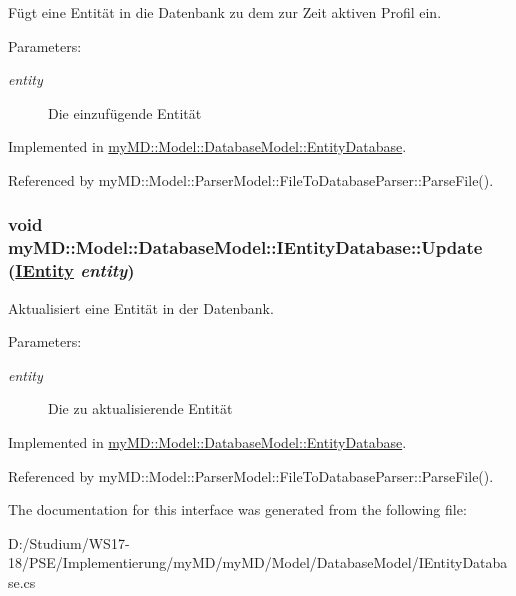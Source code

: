 F\"{u}gt eine Entit\"{a}t in die Datenbank zu dem zur Zeit aktiven Profil ein. 

\begin{Desc}
\item[Parameters:]
\begin{description}
\item[{\em entity}]Die einzuf\"{u}gende Entit\"{a}t\end{description}
\end{Desc}


Implemented in \hyperlink{classmy_m_d_1_1_model_1_1_database_model_1_1_entity_database_71b401e7c809fdda0a0b15b6792e69c8}{my\-MD::Model::Database\-Model::Entity\-Database}.

Referenced by my\-MD::Model::Parser\-Model::File\-To\-Database\-Parser::Parse\-File().\hypertarget{interfacemy_m_d_1_1_model_1_1_database_model_1_1_i_entity_database_bf510dc6cf79d153f564eca0f10971d2}{
\subsubsection[Update]{\setlength{\rightskip}{0pt plus 5cm}void my\-MD::Model::Database\-Model::IEntity\-Database::Update (\hyperlink{interfacemy_m_d_1_1_model_interface_1_1_data_model_interface_1_1_i_entity}{IEntity} {\em entity})}}
\label{d3/da9/interfacemy_m_d_1_1_model_1_1_database_model_1_1_i_entity_database_bf510dc6cf79d153f564eca0f10971d2}


Aktualisiert eine Entit\"{a}t in der Datenbank. 

\begin{Desc}
\item[Parameters:]
\begin{description}
\item[{\em entity}]Die zu aktualisierende Entit\"{a}t\end{description}
\end{Desc}


Implemented in \hyperlink{classmy_m_d_1_1_model_1_1_database_model_1_1_entity_database_bf510dc6cf79d153f564eca0f10971d2}{my\-MD::Model::Database\-Model::Entity\-Database}.

Referenced by my\-MD::Model::Parser\-Model::File\-To\-Database\-Parser::Parse\-File().

The documentation for this interface was generated from the following file:\begin{CompactItemize}
\item 
D:/Studium/WS17-18/PSE/Implementierung/my\-MD/my\-MD/Model/Database\-Model/IEntity\-Database.cs\end{CompactItemize}
